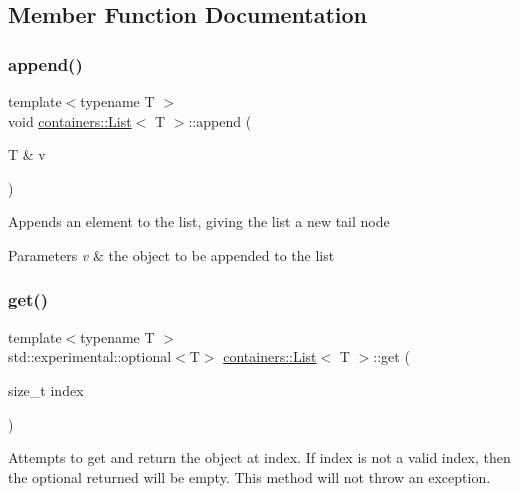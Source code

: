 \subsection{Member Function Documentation}
\mbox{\label{classcontainers_1_1_list_a9735132533e43ccf82fe0c6b2f54221b}} 
\subsubsection{\texorpdfstring{append()}{append()}}
{\footnotesize\ttfamily template$<$typename T $>$ \\
void \hyperlink{classcontainers_1_1_list}{containers\+::\+List}$<$ T $>$\+::append (\begin{DoxyParamCaption}\item[{T \&}]{v }\end{DoxyParamCaption})}

Appends an element to the list, giving the list a new tail node


\begin{DoxyParams}{Parameters}
{\em v} & the object to be appended to the list \\
\hline
\end{DoxyParams}
\mbox{\label{classcontainers_1_1_list_a3b0510ea498d73a1984dbcb3e06335d9}} 
\subsubsection{\texorpdfstring{get()}{get()}}
{\footnotesize\ttfamily template$<$typename T $>$ \\
std\+::experimental\+::optional$<$T$>$ \hyperlink{classcontainers_1_1_list}{containers\+::\+List}$<$ T $>$\+::get (\begin{DoxyParamCaption}\item[{size\+\_\+t}]{index }\end{DoxyParamCaption})\hspace{0.3cm}{\ttfamily [noexcept]}}

Attempts to get and return the object at {\ttfamily index}. If {\ttfamily index} is not a valid index, then the optional returned will be empty. This method will not throw an exception.


